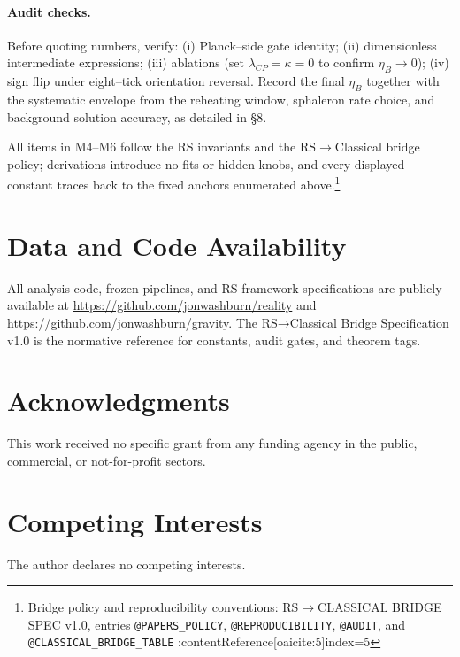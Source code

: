 \documentclass[11pt]{article}
\begin{document}
\paragraph{Audit checks.}
Before quoting numbers, verify: (i) Planck–side gate identity; (ii) dimensionless intermediate expressions; (iii) ablations (set \(\lambda_{CP}=\kappa=0\) to confirm \(\eta_B\to 0\)); (iv) sign flip under eight–tick orientation reversal. Record the final \(\eta_B\) together with the systematic envelope from the reheating window, sphaleron rate choice, and background solution accuracy, as detailed in §8.

\medskip\noindent
All items in M4–M6 follow the RS invariants and the RS\(\to\)Classical bridge policy; derivations introduce no fits or hidden knobs, and every displayed constant traces back to the fixed anchors enumerated above.\footnote{Bridge policy and reproducibility conventions: RS\(\to\)CLASSICAL BRIDGE SPEC v1.0, entries \texttt{@PAPERS\_POLICY}, \texttt{@REPRODUCIBILITY}, \texttt{@AUDIT}, and \texttt{@CLASSICAL\_BRIDGE\_TABLE} :contentReference[oaicite:5]{index=5}}

\section*{Data and Code Availability}

All analysis code, frozen pipelines, and RS framework specifications are publicly available at \url{https://github.com/jonwashburn/reality} and \url{https://github.com/jonwashburn/gravity}. The RS→Classical Bridge Specification v1.0 is the normative reference for constants, audit gates, and theorem tags.

\section*{Acknowledgments}

This work received no specific grant from any funding agency in the public, commercial, or not-for-profit sectors.

\section*{Competing Interests}

The author declares no competing interests.
\end{document}
